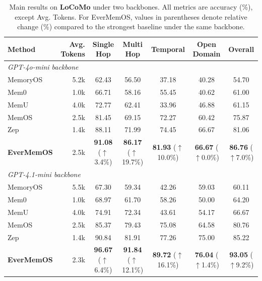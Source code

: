 \begin{table}[!h]
\centering
\small
\setlength{\tabcolsep}{5pt}
\begin{tabular}{l r ccccc}
\toprule
\textbf{Method} & \textbf{Avg. Tokens} & \textbf{Single Hop} & \textbf{Multi Hop} & \textbf{Temporal} & \textbf{Open Domain} & \textbf{Overall} \\
\midrule
\multicolumn{7}{l}{\textit{GPT-4o-mini backbone}} \\[-2pt]
MemoryOS & 5.2k & 62.43 & 56.50 & 37.18 & 40.28 & 54.70 \\
Mem0 & 1.0k & 66.71 & 58.16 & 55.45 & 40.62 & 61.00 \\
MemU & 4.0k & 72.77 & 62.41 & 33.96 & 46.88 & 61.15 \\
MemOS & 2.5k & 81.45 & 69.15 & 72.27 & 60.42 & 75.87 \\
Zep & 1.4k & 88.11 & 71.99 & 74.45 & 66.67 & 81.06 \\
\textbf{EverMemOS} & 2.5k & \textbf{91.08} {\scriptsize ($\uparrow$3.4\%)} & \textbf{86.17} {\scriptsize ($\uparrow$19.7\%)} & \textbf{81.93} {\scriptsize ($\uparrow$10.0\%)} & \textbf{66.67} {\scriptsize ($\uparrow$0.0\%)} & \textbf{86.76} {\scriptsize ($\uparrow$7.0\%)} \\

\midrule
\multicolumn{7}{l}{\textit{GPT-4.1-mini backbone}} \\[-2pt]
MemoryOS & 5.5k & 67.30 & 59.34 & 42.26 & 59.03 & 60.11 \\
Mem0 & 1.0k & 68.97 & 61.70 & 58.26 & 50.00 & 64.20 \\
MemU & 4.0k & 74.91 & 72.34 & 43.61 & 54.17 & 66.67 \\
MemOS & 2.5k & 85.37 & 79.43 & 75.08 & 64.58 & 80.76 \\
Zep & 1.4k & 90.84 & 81.91 & 77.26 & 75.00 & 85.22 \\
\textbf{EverMemOS} & 2.3k & \textbf{96.67} {\scriptsize ($\uparrow$6.4\%)} & \textbf{91.84} {\scriptsize ($\uparrow$12.1\%)} & \textbf{89.72} {\scriptsize ($\uparrow$16.1\%)} & \textbf{76.04} {\scriptsize ($\uparrow$1.4\%)} & \textbf{93.05} {\scriptsize ($\uparrow$9.2\%)} \\
\bottomrule
\end{tabular}
\caption{Main results on \textbf{LoCoMo} under two backbones. All metrics are accuracy (\%), except Avg. Tokens. For EverMemOS, values in parentheses denote relative change (\%) compared to the strongest baseline under the same backbone.}
\label{tab:locomo-main}
\end{table}